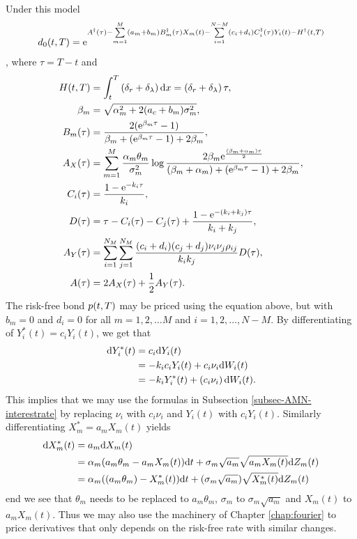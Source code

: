 Under this model
	\begin{align}
		d_0(t,T) = \mathrm{e}^{ A^{\dagger}(\tau) - \sum\limits_{m=1}^M(a_m+b_m)B_m^{\dagger}(\tau)X_m(t) - \sum\limits_{i=1}^{N-M} (c_i + d_i) C_i^{\dagger}(\tau) Y_i(t) - H^{\dagger}(t,T) }
	\end{align},
where $\tau = T-t$ and
\begin{align}
H(t,T) &= \int_t^T \left( \delta_r + \delta_{\lambda} \right) \mathrm{d} x = \left( \delta_r + \delta_{\lambda} \right) \tau, \\
\beta_m &= \sqrt{ \alpha_m^2 + 2(a_c+b_m)\sigma_m^2 }, \\
B_m(\tau) &= \frac{2 (\mathrm{e}^{\beta_m \tau} - 1) }{ \beta_m + (\mathrm{e}^{\beta_m \tau} - 1) + 2 \beta_m }, \\
A_X (\tau) &=  \sum_{m=1}^M \frac{\alpha_m \theta_m}{\sigma_m^2} \log 
	\frac{ 2 \beta_m \mathrm{e}^{ \frac{(\beta_m + \alpha_m)\tau}{2} }  }{ (\beta_m + \alpha_m) + (\mathrm{e}^{\beta_m \tau} - 1) + 2 \beta_m }, \\
C_i (\tau) &= \frac{1 - \mathrm{e}^{ - k_i \tau } }{ k_i }, \\
D(\tau) &= \tau - C_i(\tau) - C_j(\tau) + \frac{ 1 - \mathrm{e}^{ -(k_i+k_j)\tau } }{k_i + k_j}, \\
A_Y (\tau) &= \sum_{i=1}^{N_M} \sum_{j=1}^{N_M} \frac{ (c_i+d_i)(c_j+d_j)\nu_i \nu_j \rho_{ij} }{k_i k_j} D(\tau), \\
A(\tau) &= 2 A_X (\tau) + \frac{1}{2} A_Y (\tau) .
\end{align}
The risk-free bond $p(t,T)$ may be priced using the equation above, but with $b_m = 0$ and $d_i = 0$ for all $m=1,2, \ldots M$ and $i=1,2, \ldots, N-M$. By differentiating of $Y_i^*(t) = c_i Y_i(t)$, we get that
	\begin{align}
		\mathrm{d} Y_i^*(t) &= c_i \mathrm{d} Y_i(t) \\
			&= -k_i c_i Y_i(t) + c_i \nu_i \mathrm{d} W_i(t) \\
			&= -k_i Y_i^*(t) + \left( c_i \nu_i \right) \mathrm{d} W_i(t) .
	\end{align}
This implies that we may use the formulas in Subsection \ref{subsec-AMN-interestrate} by replacing $\nu_i$ with $c_i \nu_i$ and $Y_i(t)$ with $c_i Y_i(t)$. Similarly differentiating $X_m^* = a_m X_m(t)$ yields
	\begin{align}
		\mathrm{d} X_m^*(t) &= a_m \mathrm{d} X_m(t) \\
			&= \alpha_m( a_m \theta_m - a_m X_m(t) ) \mathrm{d} t + \sigma_m \sqrt{a_m} \sqrt{a_mX_m(t)} \mathrm{d} Z_m(t) \\
			&= \alpha_m( (a_m \theta_m) - X_m^*(t) ) \mathrm{d} t + (\sigma_m \sqrt{a_m}) \sqrt{X_m^*(t)} \mathrm{d} Z_m(t)
\end{align}
end we see that $\theta_m$ needs to be replaced to $a_m \theta_m$, $\sigma_m$ to $\sigma_m \sqrt{a_m}$ and $X_m(t)$ to $a_m X_m(t)$. Thus we may also use the machinery of Chapter \ref{chap:fourier} to price derivatives that only depends on the risk-free rate with similar changes.


